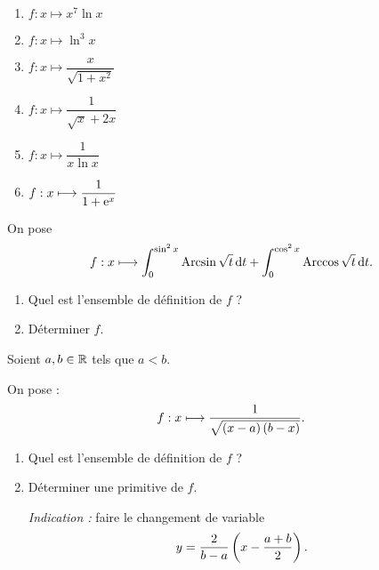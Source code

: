 \begin{exo}
\begin{enumerate}
\item \(f:x\mapsto x^7\ln x\) \\

\item \(f:x\mapsto\ln^3x\) \\

\item \(f:x\mapsto\dfrac{x}{\sqrt{1+x^2}}\) \\

\item \(f:x\mapsto\dfrac{1}{\sqrt{x}+2x}\) \\

\item \(f:x\mapsto\dfrac{1}{x\ln x}\) \\

\item \(f:x\longmapsto\dfrac{1}{1+\mathrm{e}^{x}}\)
\end{enumerate}
\end{exo}

\begin{corr}
\end{corr}

\begin{exo}
On pose \[f:x\mapsto\int_0^{\sin^2x}\Arcsin\sqrt{t}\odif{t}+\int_0^{\cos^2x}\Arccos\sqrt{t}\odif{t}.\]

\begin{enumerate}
\item Quel est l'ensemble de définition de \(f\) ? \\

\item Déterminer \(f\).
\end{enumerate}
\end{exo}

\begin{corr}
\end{corr}

\begin{exo}
Soient \(a,b\in\mathbb{R}\) tels que \(a<b\).

On pose : \[f:x\longmapsto\dfrac{1}{\sqrt{\left(x-a\right)\left(b-x\right)}}.\]

\begin{enumerate}
\item Quel est l'ensemble de définition de \(f\) ? \\

\item Déterminer une primitive de \(f\).

\textit{Indication :} faire le changement de variable \[y=\dfrac{2}{b-a}\left(x-\dfrac{a+b}{2}\right).\]
\end{enumerate}
\end{exo}

